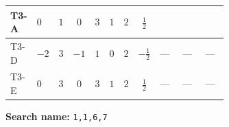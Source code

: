 \documentclass[8pt]{article}
\begin{document}
\begin{landscape}
\begin{longtable}{@{}llcccccc >{\raggedright\arraybackslash}p{0.21\linewidth} >{\raggedright\arraybackslash}p{0.21\linewidth} >{\raggedright\arraybackslash}p{0.21\linewidth}@{}}
\midrule
T3-A & $0$ & $1$ & $0$ & $3$ & $1$ & $2$ & $\frac{1}{2}$ & \scriptsize\adjustbox{max width=\linewidth}{$\begin{gathered} \frac{3^{\frac{3}{4}} i lambda12Inv1 \overline{y_{1}} \overline{y_{2}}}{6 MF}\end{gathered}$} & \scriptsize\adjustbox{max width=\linewidth}{$\begin{gathered} \frac{3^{\frac{3}{4}} i g_{1}^{2} \overline{y_{1}} \overline{y_{2}}}{8 MF}\end{gathered}$} & \scriptsize\adjustbox{max width=\linewidth}{$\begin{gathered} \frac{11 \cdot 3^{\frac{3}{4}} i g_{2}^{2} \overline{y_{1}} \overline{y_{2}}}{8 MF}\end{gathered}$} \\
\midrule
T3-D & $-2$ & $3$ & $-1$ & $1$ & $0$ & $2$ & $-\frac{1}{2}$ & --- & --- & --- \\
\midrule
T3-E & $0$ & $3$ & $0$ & $3$ & $1$ & $2$ & $\frac{1}{2}$ & --- & --- & --- \\
\midrule
\bottomrule
\end{longtable}
\clearpage
\noindent\textbf{Search name: }\texttt{1,1,6,7}\par\smallskip

\end{landscape}
\end{document}
